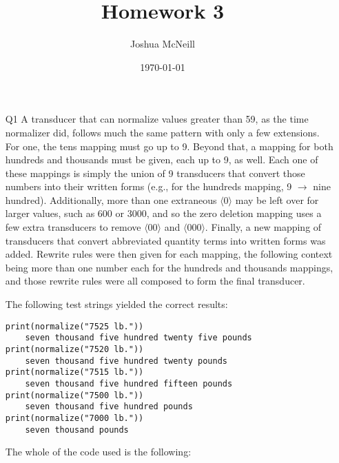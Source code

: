 \documentclass{article}
\title{Homework 3}
\author{Joshua McNeill}
\date{\today}
\newcommand{\orth}[1]{$\langle$#1$\rangle$}
\begin{document}
  \maketitle
  \begin{itemize}
    \item[Q1] A transducer that can normalize values greater than 59, as the time normalizer did, follows much the same pattern with only a few extensions. For one, the tens mapping must go up to 9. Beyond that, a mapping for both hundreds and thousands must be given, each up to 9, as well. Each one of these mappings is simply the union of 9 transducers that convert those numbers into their written forms (e.g., for the hundreds mapping, 9 $\rightarrow$ nine hundred). Additionally, more than one extraneous \orth{0} may be left over for larger values, such as 600 or 3000, and so the zero deletion mapping uses a few extra transducers to remove \orth{00} and \orth{000}. Finally, a new mapping of transducers that convert abbreviated quantity terms into written forms was added. Rewrite rules were then given for each mapping, the following context being more than one number each for the hundreds and thousands mappings, and those rewrite rules were all composed to form the final transducer.

    The following test strings yielded the correct results:
    \begin{lstlisting}
print(normalize("7525 lb."))
    seven thousand five hundred twenty five pounds
print(normalize("7520 lb."))
    seven thousand five hundred twenty pounds
print(normalize("7515 lb."))
    seven thousand five hundred fifteen pounds
print(normalize("7500 lb."))
    seven thousand five hundred pounds
print(normalize("7000 lb."))
    seven thousand pounds
    \end{lstlisting}
    The whole of the code used is the following:
    
  \end{itemize}
\end{document}
